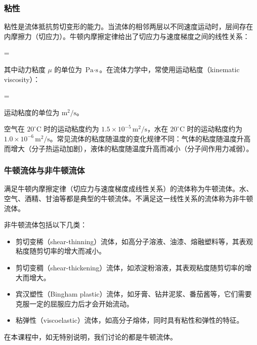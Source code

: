 \subsubsection{粘性}

粘性是流体抵抗剪切变形的能力。当流体的相邻两层以不同速度运动时，层间存在内摩擦力（切应力）。牛顿内摩擦定律给出了切应力与速度梯度之间的线性关系：

\begin{myformula}
\tau = \mu {}
\end{myformula}

其中动力粘度 \(\mu\) 的单位为 \(\text{Pa}\cdot\text{s}\)。在流体力学中，常使用运动粘度（kinematic viscosity）：

\begin{myformula}
\nu = \frac{\mu}{\rho}
\end{myformula}

运动粘度的单位为 \(\text{m}^2/\text{s}\)。

空气在 \(20^\circ\text{C}\) 时的运动粘度约为 \(1.5\times 10^{-5}\,\text{m}^2/\text{s}\)，水在 \(20^\circ\text{C}\) 时的运动粘度约为 \(1.0\times 10^{-6}\,\text{m}^2/\text{s}\)。常见流体的粘度随温度的变化规律不同：气体的粘度随温度升高而增大（分子热运动加剧），液体的粘度随温度升高而减小（分子间作用力减弱）。

\subsubsection{牛顿流体与非牛顿流体}

满足牛顿内摩擦定律（切应力与速度梯度成线性关系）的流体称为牛顿流体。水、空气、酒精、甘油等都是典型的牛顿流体。不满足这一线性关系的流体称为非牛顿流体。

非牛顿流体包括以下几类：

\begin{itemize}
    \item 剪切变稀（shear-thinning）流体，如高分子溶液、油漆、熔融塑料等，其表观粘度随剪切率的增大而减小。
    \item 剪切变稠（shear-thickening）流体，如浓淀粉溶液，其表观粘度随剪切率的增大而增大。
    \item 宾汉塑性（Bingham plastic）流体，如牙膏、钻井泥浆、番茄酱等，它们需要克服一定的屈服应力后才会开始流动。
    \item 粘弹性（viscoelastic）流体，如高分子熔体，同时具有粘性和弹性的特征。
\end{itemize}

在本课程中，如无特别说明，我们讨论的都是牛顿流体。

